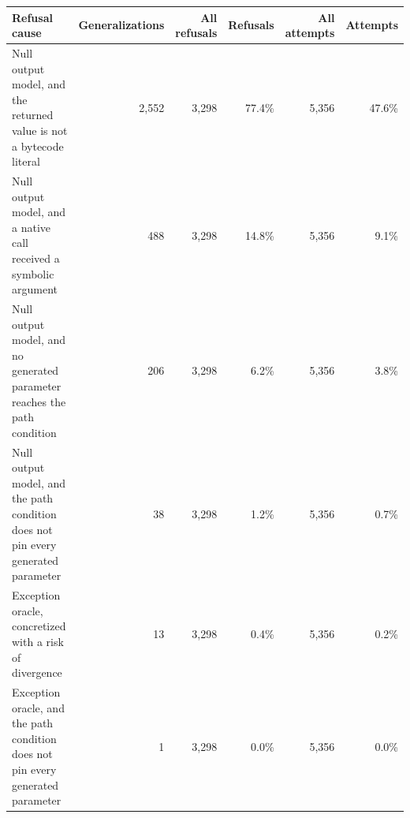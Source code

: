   \renewcommand{\theHreporttablerow}{rq6_widening_refusals.\arabic{reporttablerow}}
  \setcounter{reporttablerow}{0}
  \begin{tabular}{lrrrrr}
  \toprule
  Refusal cause & Generalizations & All refusals & Refusals & All attempts & Attempts \\
  \midrule
  {reporttablerow}\label{tabrow:rq6_widening_refusals:NULL_CONCRETE_OUTPUT_NOT_LITERAL}Null output model, and the returned value is not a bytecode literal & 2,552 & 3,298 & 77.4\% & 5,356 & 47.6\% \\
  {reporttablerow}\label{tabrow:rq6_widening_refusals:NULL_CONCRETE_CONCRETIZATION_EVENTS}Null output model, and a native call received a symbolic argument & 488 & 3,298 & 14.8\% & 5,356 & 9.1\% \\
  {reporttablerow}\label{tabrow:rq6_widening_refusals:NULL_CONCRETE_PARAMETERS_EMPTY}Null output model, and no generated parameter reaches the path condition & 206 & 3,298 & 6.2\% & 5,356 & 3.8\% \\
  {reporttablerow}\label{tabrow:rq6_widening_refusals:NULL_CONCRETE_PATH_CONDITION_NOT_COVERING_PARAMETERS}Null output model, and the path condition does not pin every generated parameter & 38 & 3,298 & 1.2\% & 5,356 & 0.7\% \\
  {reporttablerow}\label{tabrow:rq6_widening_refusals:EXCEPTION_CONCRETIZATION_DIVERGENCE_RISK}Exception oracle, concretized with a risk of divergence & 13 & 3,298 & 0.4\% & 5,356 & 0.2\% \\
  {reporttablerow}\label{tabrow:rq6_widening_refusals:EXCEPTION_PATH_CONDITION_NOT_COVERING_PARAMETERS}Exception oracle, and the path condition does not pin every generated parameter & 1 & 3,298 & 0.0\% & 5,356 & 0.0\% \\
  \bottomrule
  \end{tabular}
